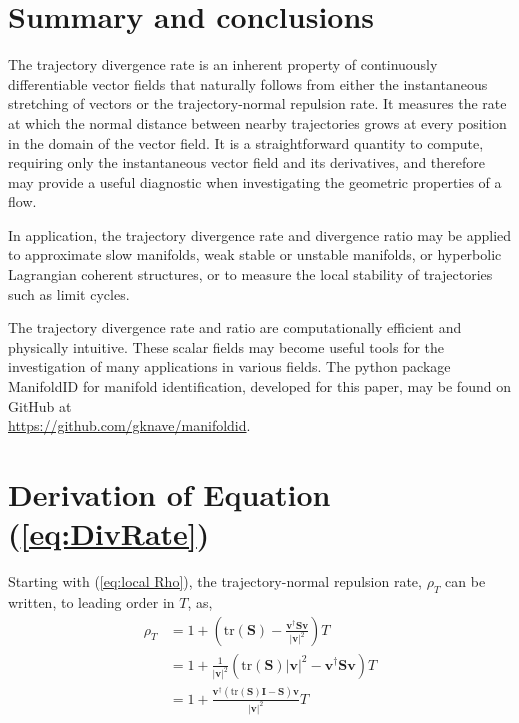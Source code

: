 \documentclass[twocolumn]{svjour3}
\begin{document}
\section{Summary and conclusions}\label{s:Summary}	
The trajectory divergence rate is an inherent property of continuously differentiable vector fields that naturally follows from either the instantaneous stretching of vectors or the trajectory-normal repulsion rate. It measures the rate at which the normal distance between nearby trajectories grows at every position in the domain of the vector field. It is a straightforward quantity to compute, requiring only the instantaneous vector field and its derivatives, and therefore may provide a useful diagnostic when investigating the geometric properties of a flow.

In application, the trajectory divergence rate and divergence ratio may be applied to approximate slow manifolds, weak stable or unstable manifolds, or hyperbolic Lagrangian coherent structures, or to measure the local stability of trajectories such as limit cycles.

The trajectory divergence rate and ratio are computationally efficient and physically intuitive. These scalar fields may become useful tools for the investigation of many applications in various fields. The python package ManifoldID for manifold identification, developed for this paper, may be found on GitHub at \\ \href{https://github.com/gknave/manifoldid}{https://github.com/gknave/manifoldid}.

%	

%	


\appendix

\section{Derivation of Equation (\ref{eq:DivRate})} \label{ap: normal derivation}
Starting with (\ref{eq:local Rho}), the trajectory-normal repulsion rate, \(\rho_T\) can be written, to leading order in $T$, as,
\begin{equation}
\begin{aligned}
\rho_T &= 1+ \left(\text{tr}(\mathbf{S})-\frac{\mathbf{v}^\dagger\mathbf{S}\mathbf{v}}{\left|\mathbf{v}\right|^2}\right)T \\
&= 1+ \frac{1}{\left|\mathbf{v}\right|^2}(\text{tr}(\mathbf{S})\left|\mathbf{v}\right|^2-\mathbf{v}^\dagger\mathbf{S}\mathbf{v})T  \\
&= 1+ \frac{\mathbf{v}^\dagger(\text{tr}(\mathbf{S})\mathbf{I} - \mathbf{S})\mathbf{v}}{\left|\mathbf{v}\right|^2}T
\end{aligned}
\end{equation}
\end{document}
